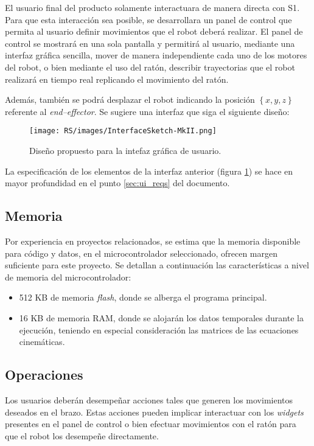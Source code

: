El usuario final del producto solamente interactuara de manera directa con \ac{S1}.
Para que esta interacción sea posible, se desarrollara un panel de control que permita al usuario definir movimientos que el robot deberá realizar. El panel de control se mostrará en una sola pantalla y permitirá al usuario, mediante una interfaz gráfica sencilla, mover de manera independiente cada uno de los motores del robot, o bien mediante el uso del ratón, describir trayectorias que el robot realizará en tiempo real replicando el movimiento del ratón.

Además, también se podrá desplazar el robot indicando la posición $\left\{x, y, z\right\}$ referente al \textit{end--effector}. Se sugiere una interfaz que siga el siguiente diseño:

\begin{figure}[H]
    \centering
    \texttt{[image: RS/images/InterfaceSketch-MkII.png]}
    \caption{Diseño propuesto para la intefaz gráfica de usuario.}
    \label{fig:ui_design}
\end{figure}

La especificación de los elementos de la interfaz anterior (figura \ref{fig:ui_design}) se hace en mayor profundidad en el punto \ref{sec:ui_reqs} del documento.

\subsection{Memoria}

Por experiencia en proyectos relacionados, se estima que la memoria disponible para 
código y datos, en el microcontrolador seleccionado, ofrecen margen suficiente para este
proyecto. Se detallan a continuación las características a nivel de memoria del
microcontrolador:

\begin{itemize}
    \item 512 KB de memoria \textit{flash}, donde se alberga el programa principal.
    \item 16 KB de memoria \ac{RAM}, donde se alojarán los datos temporales durante la ejecución, teniendo en especial consideración las matrices de las ecuaciones cinemáticas.
\end{itemize}

\subsection{Operaciones}

Los usuarios deberán desempeñar acciones tales que generen los movimientos deseados en el brazo. Estas acciones pueden implicar interactuar con los \textit{widgets} presentes en el panel de control o bien efectuar movimientos con el ratón para que el robot los desempeñe directamente.
